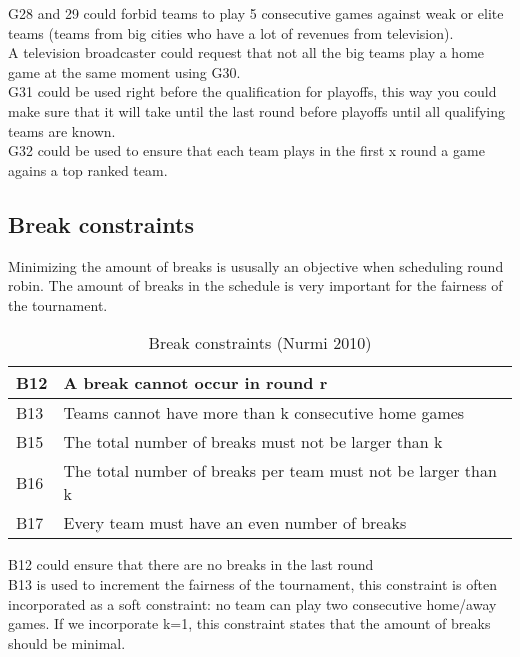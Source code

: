 G28 and 29 could forbid teams to play 5 consecutive games against weak or elite teams (teams from big cities who have a lot of revenues from television). 
\\[5px]
A television broadcaster could request that not all the big teams play a home game at the same moment using G30. 
\\[5px]
G31 could be used right before the qualification for playoffs, this way you could make sure that it will take until the last round before playoffs until all qualifying teams are known. 
\\[5px]
G32 could be used to ensure that each team plays in the first x round a game agains a top ranked team. 

\subsection{Break constraints}
Minimizing the amount of breaks is ususally an objective when scheduling round robin. The amount of breaks in the schedule is very important for the fairness of the tournament.


\begin{table}[h]
\begin{tabular}{|l|l|}
\hline
B12 & A break cannot occur in round r                               \\
\hline
B13 & Teams cannot have more than k consecutive home games          \\
\hline
B15 & The total number of breaks must not be larger than k          \\
\hline
B16 & The total number of breaks per team must not be larger than k \\
\hline
B17 & Every team must have an even number of breaks   				  \\             
\hline
\end{tabular}
\caption{Break constraints (Nurmi 2010)}
\label{tbl5}
\end{table}

B12 could ensure that there are no breaks in the last round
\\[5px]
B13 is used to increment the fairness of the tournament, this constraint is often incorporated as a soft constraint: no team can play two consecutive home/away games. If we incorporate k=1, this constraint states that the amount of breaks should be minimal. 



